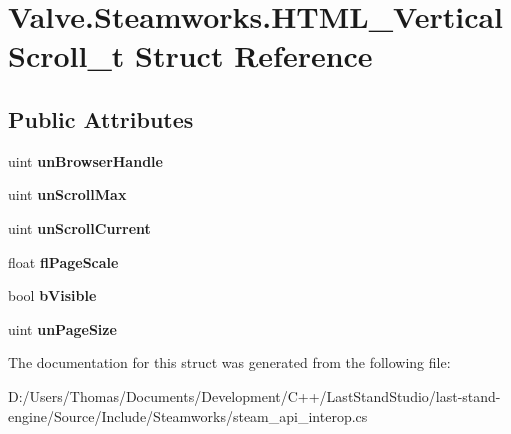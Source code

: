 \hypertarget{structValve_1_1Steamworks_1_1HTML__VerticalScroll__t}{}\section{Valve.\+Steamworks.\+H\+T\+M\+L\+\_\+\+Vertical\+Scroll\+\_\+t Struct Reference}
\label{structValve_1_1Steamworks_1_1HTML__VerticalScroll__t}
\subsection*{Public Attributes}
\begin{DoxyCompactItemize}
\item 
\hypertarget{structValve_1_1Steamworks_1_1HTML__VerticalScroll__t_a2059ff9cb7f6ffe613149552806ec5af}{}uint {\bfseries un\+Browser\+Handle}\label{structValve_1_1Steamworks_1_1HTML__VerticalScroll__t_a2059ff9cb7f6ffe613149552806ec5af}

\item 
\hypertarget{structValve_1_1Steamworks_1_1HTML__VerticalScroll__t_ad411f14f9c5e38c4db2ef9e7eee849af}{}uint {\bfseries un\+Scroll\+Max}\label{structValve_1_1Steamworks_1_1HTML__VerticalScroll__t_ad411f14f9c5e38c4db2ef9e7eee849af}

\item 
\hypertarget{structValve_1_1Steamworks_1_1HTML__VerticalScroll__t_ac013b093c5ea532ed609eac81078ddad}{}uint {\bfseries un\+Scroll\+Current}\label{structValve_1_1Steamworks_1_1HTML__VerticalScroll__t_ac013b093c5ea532ed609eac81078ddad}

\item 
\hypertarget{structValve_1_1Steamworks_1_1HTML__VerticalScroll__t_afd4f9716097c4c155e795834a42ceb26}{}float {\bfseries fl\+Page\+Scale}\label{structValve_1_1Steamworks_1_1HTML__VerticalScroll__t_afd4f9716097c4c155e795834a42ceb26}

\item 
\hypertarget{structValve_1_1Steamworks_1_1HTML__VerticalScroll__t_af9171920732de51cdaa9b472d1e4fe32}{}bool {\bfseries b\+Visible}\label{structValve_1_1Steamworks_1_1HTML__VerticalScroll__t_af9171920732de51cdaa9b472d1e4fe32}

\item 
\hypertarget{structValve_1_1Steamworks_1_1HTML__VerticalScroll__t_adeecb2fed5dcb9018f9f4cf862f32233}{}uint {\bfseries un\+Page\+Size}\label{structValve_1_1Steamworks_1_1HTML__VerticalScroll__t_adeecb2fed5dcb9018f9f4cf862f32233}

\end{DoxyCompactItemize}


The documentation for this struct was generated from the following file\+:\begin{DoxyCompactItemize}
\item 
D\+:/\+Users/\+Thomas/\+Documents/\+Development/\+C++/\+Last\+Stand\+Studio/last-\/stand-\/engine/\+Source/\+Include/\+Steamworks/steam\+\_\+api\+\_\+interop.\+cs\end{DoxyCompactItemize}
